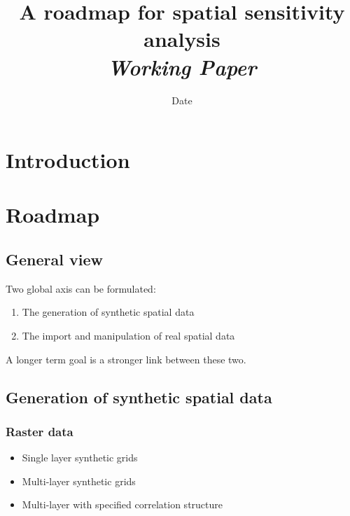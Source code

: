 


\title{A roadmap for spatial sensitivity analysis\bigskip\\
\textit{Working Paper}
}
\author{}
\date{Date}


\maketitle

\justify


\begin{abstract}

\end{abstract}




\section{Introduction}







\section{Roadmap}


\subsection{General view}

Two global axis can be formulated:

\begin{enumerate}
	\item The generation of synthetic spatial data
	\item The import and manipulation of real spatial data 
\end{enumerate}

A longer term goal is a stronger link between these two.


\subsection{Generation of synthetic spatial data}


\subsubsection{Raster data}

\begin{itemize}
	\item Single layer synthetic grids
	\item Multi-layer synthetic grids
	\item Multi-layer with specified correlation structure
\end{itemize}

